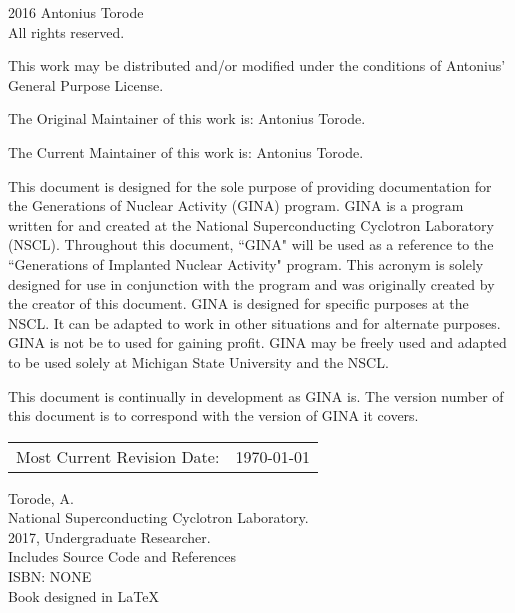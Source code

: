 \pagestyle{empty}
\begingroup
\footnotesize
\parindent 0pt
\parskip \baselineskip
\textcopyright{} 2016 Antonius Torode \\
All rights reserved.

This work may be distributed and/or modified under the conditions of Antonius' General Purpose License.

The Original Maintainer of this work is: Antonius Torode.

The Current Maintainer of this work is: Antonius Torode.

This document is designed for the sole purpose of providing documentation for the Generations of Nuclear Activity (GINA) program. GINA is a program written for and created at the National Superconducting Cyclotron Laboratory (NSCL). Throughout this document, ``GINA" will be used as a reference to the ``Generations of Implanted Nuclear Activity" program. This acronym is solely designed for use in conjunction with the program and was originally created by the creator of this document. GINA is designed for specific purposes at the NSCL. It can be adapted to work in other situations and for alternate purposes. GINA is not be to used for gaining profit. GINA may be freely used and adapted to be used solely at Michigan State University and the NSCL.

This document is continually in development as GINA is. The version number of this document is to correspond with the version of GINA it covers.


\begin{center}
\begin{tabular}{ll}
Most Current Revision Date: &  \today 
\end{tabular}
\end{center}

\vfill

Torode, A.\\
\hspace*{2em} National Superconducting Cyclotron Laboratory. \\
\hspace*{2em} 2017, Undergraduate Researcher. \\
\hspace*{2em} Includes Source Code and References \\
\hspace*{2em} ISBN: NONE \\
\hspace*{2em} Book designed in \LaTeX



\endgroup
\clearpage